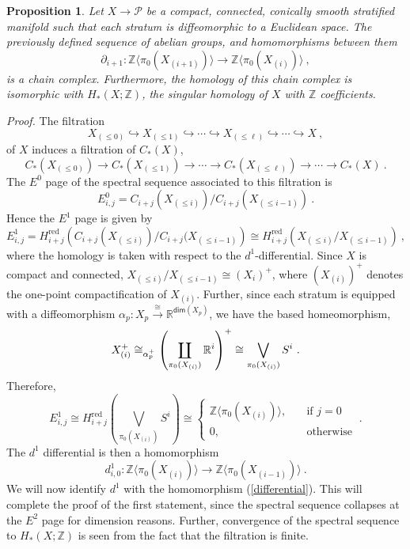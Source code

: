\documentclass{article}
\newcommand{\bb}[1]{\mathbb{#1}}
\newcommand{\mc}[1]{\mathcal{#1}}
\newcommand{\msf}[1]{\mathsf{#1}}
\newtheorem{proposition}[theorem]{Proposition}
\theoremstyle{definition}
\begin{document}
\begin{proposition}\label{homology}
    Let $X \to \mc{P}$ be a compact, connected, conically smooth stratified manifold
    such that each stratum is diffeomorphic to a Euclidean space. The previously defined sequence of abelian
    groups, and homomorphisms between them
    $$\partial_{i+1}: \bb{Z}\langle \pi_0(X_{(i+1)})\rangle \to \bb{Z}\langle \pi_0(X_{(i)})\rangle~,$$
    is a chain complex. Furthermore, the homology of this chain complex is isomorphic with 
    $H_*(X;\bb{Z})$, the singular homology of $X$ with $\bb{Z}$ coefficients.
\end{proposition}
{\it Proof.} The filtration
$$X_{(\le0)} \hookrightarrow X_{(\le 1)} \hookrightarrow \cdots \hookrightarrow X_{(\le \ell)} \hookrightarrow
    \cdots \hookrightarrow X~,$$
of $X$ induces a filtration of $C_*(X)$,
$$C_*(X_{(\le0)}) \to C_*(X_{(\le 1)}) \to \cdots \to C_*(X_{(\le \ell)}) \to \cdots \to C_*(X)~.$$
The $E^0$ page of the spectral sequence associated to this filtration is
$$E^0_{i,j} = C_{i+j}(X_{(\le i)}) / C_{i+j}(X_{(\le i-1)})~.$$
Hence the $E^1$ page is given by
$$E^1_{i,j} = H^\text{red}_{i+j}\left(C_{i+j}(X_{(\le i)}) / C_{i+j}(X_{(\le i-1)}\right) \cong
    H^\text{red}_{i+j}\left(X_{(\le i)} / X_{(\le i-1)}\right)~,$$
where the homology is taken with respect to the $d^1$-differential.
Since $X$ is compact and connected, $X_{(\le i)} / X_{(\le i-1)} \cong (X_i)^+$, where
$(X_{(i)})^+$ denotes the one-point compactification of $X_{(i)}$. Further, since each stratum is equipped with a diffeomorphism $\alpha_p:X_p \xrightarrow{\cong} \bb{R}^{\msf{dim}(X_p)}$, 
we have the based homeomorphism,
\begin{equation}\label{wedge}
    X_{(i)}^+ \cong_{\alpha_p^+} \left(\coprod_{\pi_0(X_{(i)})} \mathbb R^i \right)^+
    \cong \bigvee_{\pi_0(X_{(i)})} S^i~.
\end{equation}
Therefore, 
$$E^1_{i,j} \cong H^\text{red}_{i+j}\left( \bigvee_{\pi_0(X_{(i)})} S^i\right)
    \cong \begin{cases} \bb{Z}\langle \pi_0(X_{(i)})\rangle , &\quad \text{if } j=0 \\
                                      0, &\quad \text{otherwise}
              \end{cases}~.$$
The $d^1$ differential is then a homomorphism
$$d^1_{i,0}: \bb{Z}\langle \pi_0(X_{(i)})\rangle \to \bb{Z}\langle \pi_0(X_{(i-1)})\rangle~.$$
We will now identify $d^1$ with the homomorphism (\ref{differential}). This will complete the proof of the first 
statement, since the spectral sequence collapses at the $E^2$ page for dimension reasons. 
Further, convergence of the spectral sequence
to $H_*(X; \bb{Z})$ is seen from the fact that the filtration is finite. \\
\end{document}
